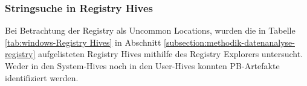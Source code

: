\begin{appendices}

\subsubsection*{Stringsuche in Registry Hives}
Bei Betrachtung der Registry als Uncommon Locations, wurden die in Tabelle \ref{tab:windows-Registry Hives} in Abschnitt \ref{subsection:methodik-datenanalyse-registry} aufgelisteten Registry Hives mithilfe des Registry Explorers untersucht. 
Weder in den System-Hives noch in den User-Hives konnten PB-Artefakte identifiziert werden. 


	
\end{appendices}